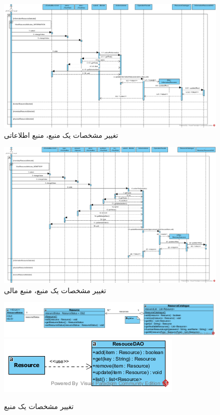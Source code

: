\begin{landscape}
\begin{figure}[H]
\end{figure}
\begin{figure}[H]
	\centering
	\includegraphics[scale=0.6]{img/sequence-design/EditResourceAttributes_INFORMATION}
	\caption{تغییر مشخصات یک منبع، منبع اطلاعاتی}
\end{figure}
\begin{figure}[H]
	\centering
	\includegraphics[scale=0.6]{img/sequence-design/EditResourceAttributes_MONETARY}
	\caption{تغییر مشخصات یک منبع، منبع مالی}
\end{figure}

\begin{figure}[H]
	\centering
	\includegraphics[scale=0.7]{img/sequence-design/EditResourceAttributesC}
	\includegraphics[scale=0.7]{img/sequence-design/EditResourceAttributesD}
	\caption{تغییر مشخصات یک منبع}
\end{figure}


\end{landscape}
